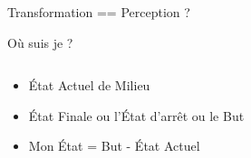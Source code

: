 \documentclass{beamer}
\begin{document}
\begin{frame}{Transformation == Perception ?}
\end{frame}

\begin{frame}{Où suis je ?}
\begin{columns}
\begin{column}{0.6\textwidth}
\begin{block}{}

\begin{itemize}
    \item État Actuel de Milieu
    \item État Finale ou l'État d'arrêt ou le But
    \item Mon État = But - État Actuel
\end{itemize}


\end{block}
\end{column}
\end{columns}
\end{frame}
\end{document}
